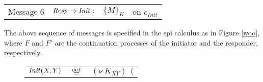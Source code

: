 \documentclass[10pt,a4paper,final,oneside,fleqn]{book}
\newcommand*{\eqdef}{\mathbin{\mathop{=}\limits^{\texttt{def}}}}
\begin{document}
\begin{tabular}{llll}
Message 6&\hspace{5mm}$\mbox{{\itshape Resp\/}}\to\mbox{{\itshape Init\/}}:$&$\{M\}_{K}$&on $c_{Init}$
\end{tabular}\vspace{5mm}

\noindent
The above sequence of messages is specified in the spi calculus as in Figure \ref{woo}, where $F$ and $F'$ are the continuation processes of the initiator and the responder, respectively.
\begin{figure}[!tbp]
\begin{center}
\begin{tabular}{|lll|}
\hline
$\mbox{{\itshape Init\/}}(X,Y)$&$\eqdef$&$(\nu~\!K_{XY})~~($\\


\end{tabular}
\end{center}
\end{figure}
\end{document}
